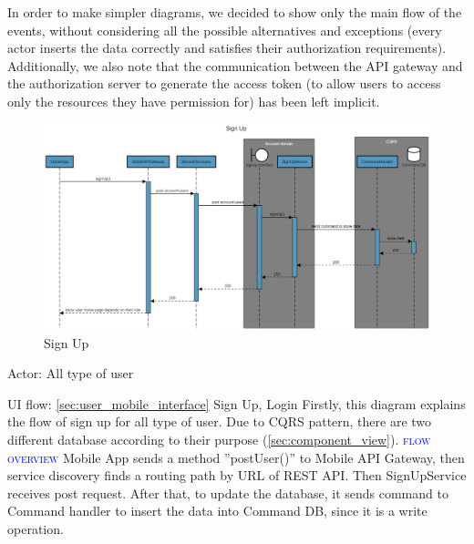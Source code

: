 
In order to make simpler diagrams, we decided to show only the main flow of the events, without considering all the possible alternatives and exceptions (every actor inserts the data correctly and satisfies their authorization requirements).
\newline
Additionally, we also note that the communication between the API gateway and the authorization server to generate the access token (to allow users to access only the resources they have permission for) has been left implicit.


\begin{figure}[H]
	\centering
    \includegraphics[width=\textwidth]{Images/sequence-diagram/sign-up.png}
	\caption{\label{fig:se_sign_up}Sign Up}
\end{figure}
Actor: All type of user


UI flow: {\ref{sec:user_mobile_interface} Sign Up, Login}
\newline
\newline
Firstly, this diagram explains the flow of sign up for all type of user. 
Due to CQRS pattern, there are two different database according to their purpose (\ref{sec:component_view}). 
\newline
\newline
\textsc{\textcolor{blue}{flow overview}}
\newline
Mobile App sends a method ”postUser()” to Mobile API Gateway, then service discovery finds a routing path by URL of REST API.
Then SignUpService receives post request. After that, to update the database, it sends command to Command handler to insert the data into Command DB, since it is a write operation.

